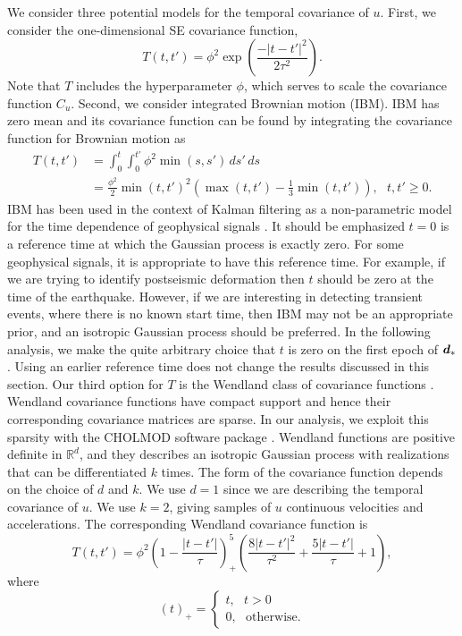 \documentclass[extra,mreferee]{gji}
\begin{document}
We consider three potential models for the temporal covariance of $u$. First, we consider the one-dimensional SE covariance function, 
\begin{equation}\label{eq:TimeSE}
T(t,t') = \phi^2\exp\left(\frac{-|t - t'|^2}{2\tau^2}\right).
\end{equation}
Note that $T$ includes the hyperparameter $\phi$, which serves to scale the covariance function $C_u$. Second, we consider integrated Brownian motion (IBM). IBM has zero mean and its covariance function can be found by integrating the covariance function for Brownian motion as
\begin{align}\label{eq:IBM}
T(t,t') &= \int_0^t \int_0^{t'} \phi^2 \min(s,s') \,ds'\,ds \\
        &= \frac{\phi^2}{2}\min(t,t')^2 \left(\max(t,t') - \frac{1}{3}\min(t,t')\right), \ \ \ t,t' \geq 0.
\end{align}
IBM has been used in the context of Kalman filtering as a non-parametric model for the time dependence of geophysical signals \citep[e.g.,][]{Segall1997,McGuire2003,Ohtani2010,Hines2016a}. It should be emphasized $t=0$ is a reference time at which the Gaussian process is exactly zero. For some geophysical signals, it is appropriate to have this reference time. For example, if we are trying to identify postseismic deformation then $t$ should be zero at the time of the earthquake.  However, if we are interesting in detecting transient events, where there is no known start time, then IBM may not be an appropriate prior, and an isotropic Gaussian process should be preferred. In the following analysis, we make the quite arbitrary choice that $t$ is zero on the first epoch of $\mitbf{d}_*$. Using an earlier reference time does not change the results discussed in this section. Our third option for $T$ is the Wendland class of covariance functions \citep{Wendland2005}. Wendland covariance functions have compact support and hence their corresponding covariance matrices are sparse. In our analysis, we exploit this sparsity with the CHOLMOD software package \citep{Chen2008}. Wendland functions are positive definite in $\mathbb{R}^d$, and they describes an isotropic Gaussian process with realizations that can be differentiated $k$ times. The form of the covariance function depends on the choice of $d$ and $k$. We use $d=1$ since we are describing the temporal covariance of $u$. We use $k=2$, giving samples of $u$ continuous velocities and accelerations. The corresponding Wendland covariance function is 
\begin{equation}\label{eq:Wendland}
T(t,t') = \phi^2\left(1 - \frac{|t - t'|}{\tau}\right)^5_+ \left(\frac{8|t - t'|^2}{\tau^2} + \frac{5|t - t'|}{\tau} + 1\right), 
\end{equation}
where
\begin{equation}
(t)_+ = 
\begin{cases}
t, \ \ \ t > 0 \\
0, \ \ \ \mathrm{otherwise}.
\end{cases}
\end{equation}
\end{document}
